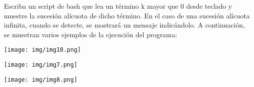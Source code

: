 \documentclass{article}
\begin{document}
Escriba un script de bash que lea un término k mayor que 0 desde teclado y
muestre la sucesión alícuota de dicho término. En el caso de una sucesión
alícuota infinita, cuando se detecte, se mostrará un mensaje indicándolo. A
continuación, se muestran varios ejemplos de la ejecución del programa:

 
\begin{center}
\texttt{[image: img/img10.png]} 
\end{center}


\begin{center}
\texttt{[image: img/img7.png]} 
\end{center}


\begin{center}
\texttt{[image: img/img8.png]} 
\end{center}
\end{document}
